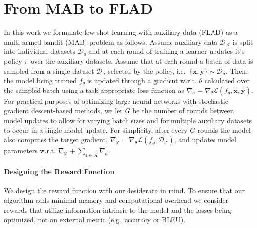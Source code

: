 \section{From MAB to FLAD}
\label{sec:mab_to_flad}

In this work we formulate few-shot learning with auxiliary data (FLAD) as a multi-armed bandit (MAB) problem as follows. Assume auxiliary data $\mathcal{D}_{\mathcal{A}}$ is split into individual datasets $\mathcal{D}_{a}$ and at each round of training a learner updates it's policy $\pi$ over the auxiliary datasets. Assume that at each round a batch of data is sampled from a single dataset $\mathcal{D}_{a}$ selected by the policy, i.e.\ $\{\mathbf{x},\mathbf{y}\} \sim \mathcal{D}_{a}$. Then, the model being trained $f_\theta$ is updated through a gradient w.r.t. $\theta$ calculated over the sampled batch using a task-appropriate loss function as $\nabla_{a}=\nabla_{\theta}\mathcal{L}(\mathit{f}_{\theta},\mathbf{x},\mathbf{y})$. For practical purposes of optimizing large neural networks with stochastic gradient descent-based methods, we let $G$ be the number of rounds between model updates to allow for varying batch sizes and for multiple auxiliary datasets to occur in a single model update. For simplicity, after every $G$ rounds the model also computes the target gradient, $\nabla_{\mathcal{T}}=\nabla_{\theta}\mathcal{L}(\mathit{f}_{\theta},\mathcal{D}_{\mathcal{T}})$, and updates model parameters w.r.t. $\nabla_{\mathcal{T}}+\sum_{a\in\mathcal{A}}\nabla_{a}$.

\paragraph{Designing the Reward Function}
We design the reward function with our desiderata in mind. To ensure that our algorithm adds minimal memory and computational overhead we consider rewards that utilize information intrinsic to the model and the losses being optimized, not an external metric (e.g.\ accuracy or BLEU).

